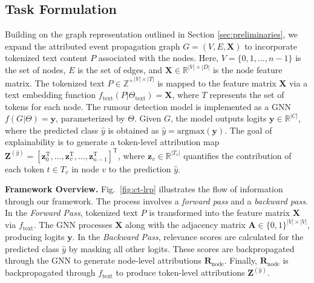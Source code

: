 \subsection{Task Formulation}
Building on the graph representation outlined in Section \ref{sec:preliminaries}, we expand the attributed event propagation graph \( G = (V, E, \mathbf{X}) \) to incorporate tokenized text content \( P \) associated with the nodes. Here, \( V = \{0, 1, \ldots, n-1\} \) is the set of nodes, \( E \) is the set of edges, and \( \mathbf{X} \in \mathbb{R}^{|V| \times |D|} \) is the node feature matrix. The tokenized text \( P \in \mathbb{Z^+}^{|V| \times |T|} \) is mapped to the feature matrix \( \mathbf{X} \) via a text embedding function \( f_{\text{text}}(P | \Theta_{\text{text}}) = \mathbf{X} \), where \( T \) represents the set of tokens for each node. The rumour detection model is implemented as a GNN \( f(G | \Theta) = \mathbf{y} \), parameterized by \( \Theta \). Given \( G \), the model outputs logits \( \mathbf{y} \in \mathbb{R}^{|C|} \), where the predicted class \( \hat{y} \) is obtained as \( \hat{y} = \text{argmax}(\mathbf{y}) \). The goal of explainability is to generate a token-level attribution map \( \mathbf{Z}^{(\hat{y})} = [\mathbf{z}_0^\text{T}, \ldots, \mathbf{z}_v^\text{T}, \ldots, \mathbf{z}_{n-1}^\text{T}]^\text{T} \), where \( \mathbf{z}_v \in \mathbb{R}^{|T_v|} \) quantifies the contribution of each token \( t \in T_v \) in node \( v \) to the prediction \( \hat{y} \).

\textbf{Framework Overview.} Fig.~\ref{fig:ct-lrp} illustrates the flow of information through our framework. The process involves a \textit{forward pass} and a \textit{backward pass}. In the \textit{Forward Pass}, tokenized text \( P \) is transformed into the feature matrix \( \mathbf{X} \) via \( f_{\text{text}} \). The GNN processes \( \mathbf{X} \) along with the adjacency matrix \( \mathbf{A} \in \{0, 1\}^{|V| \times |V|} \), producing logits \( \mathbf{y} \). In the \textit{Backward Pass}, relevance scores are calculated for the predicted class \( \hat{y} \) by masking all other logits. These scores are backpropagated through the GNN to generate node-level attributions \( \mathbf{R}_{\text{node}} \). Finally, \( \mathbf{R}_{\text{node}} \) is backpropagated through \( f_{\text{text}} \) to produce token-level attributions \( \mathbf{Z}^{(\hat{y})} \).

